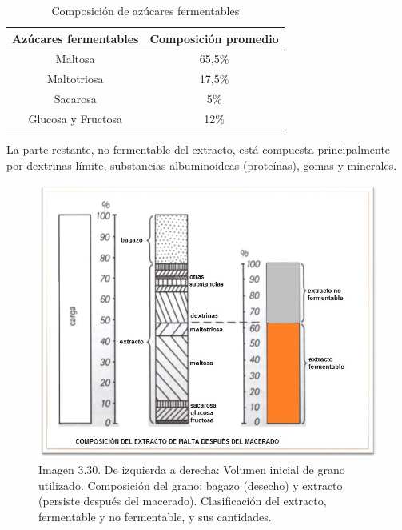             \begin{table}[h]
                \centering
                \begin{tabular}{|c|c|}
                    \hline
                     Azúcares fermentables &  Composición promedio \\
                     \hline
                     Maltosa & 65,5\% \\
                     \hline
                     Maltotriosa & 17,5\% \\
                     \hline
                     Sacarosa & 5\% \\
                     \hline
                     Glucosa y Fructosa & 12\% \\
                     \hline
                \end{tabular}
                \caption{Composición de azúcares fermentables}
                \label{tab:ComposicionAzucaresFermentables}
            \end{table}
            
            \par La parte restante, no fermentable del extracto, está compuesta principalmente por dextrinas límite, substancias albuminoideas (proteínas), gomas y minerales.
            \begin{figure} [h]		                                                                        \centerline{\includegraphics[scale=0.6]{composicion_luego_macerado.jpg}}
                \caption{Imagen 3.30. De izquierda a derecha: Volumen inicial de grano utilizado. Composición del grano: bagazo (desecho) y extracto (persiste después del macerado). Clasificación del extracto, fermentable y no fermentable, y sus cantidades. \cite{Kunze}}
                \label{ComposicionExtracto}
            \end{figure}
            
